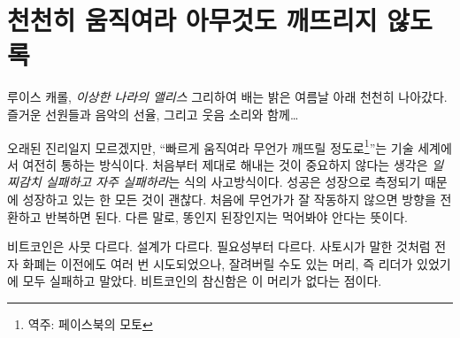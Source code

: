 \chapter{천천히 움직여라 아무것도 깨뜨리지 않도록}
\label{les:18}

\begin{chapquote}{루이스 캐롤, \textit{이상한 나라의 앨리스}}
	그리하여 배는 밝은 여름날 아래 천천히 나아갔다. 즐거운 선원들과 음악의 선율, 그리고 웃음 소리와 함께\ldots
\end{chapquote}

\begin{comment}
	It might be a dead mantra, but \enquote{move fast and break things} is still how
	much of the tech world operates. The idea that it doesn't matter if you
	get things right the first time is a basic pillar of the \textit{fail early,
		fail often} mentality. Success is measured in growth, so as long as you
	are growing everything is fine. If something doesn't work at first you
	simply pivot and iterate. In other words: throw enough shit against the
	wall and see what sticks.
\end{comment}
오래된 진리일지 모르겠지만, \enquote{빠르게 움직여라 무언가 깨뜨릴 정도로\footnote{역주: 페이스북의 모토}}는 기술 세계에서 여전히 통하는 방식이다.
처음부터 제대로 해내는 것이 중요하지 않다는 생각은 \textit{일찌감치 실패하고 자주 실패하라}는 식의 사고방식이다.
성공은 성장으로 측정되기 때문에 성장하고 있는 한 모든 것이 괜찮다. 
처음에 무언가가 잘 작동하지 않으면 방향을 전환하고 반복하면 된다. 
다른 말로, 똥인지 된장인지는 먹어봐야 안다는 뜻이다.

\begin{comment}
	Bitcoin is very different. It is different by design. It is different
	out of necessity. As Satoshi pointed out, e-currency has been tried
	many times before, and all previous attempts have failed because there
	was a head which could be cut off. The novelty of Bitcoin is that it is
	a beast without heads.
\end{comment}
비트코인은 사뭇 다르다. 설계가 다르다. 필요성부터 다르다. 
사토시가 말한 것처럼 전자 화폐는 이전에도 여러 번 시도되었으나, 잘려버릴 수도 있는 머리, 즉 리더가 있었기에 모두 실패하고 말았다. 
비트코인의 참신함은 이 머리가 없다는 점이다.

